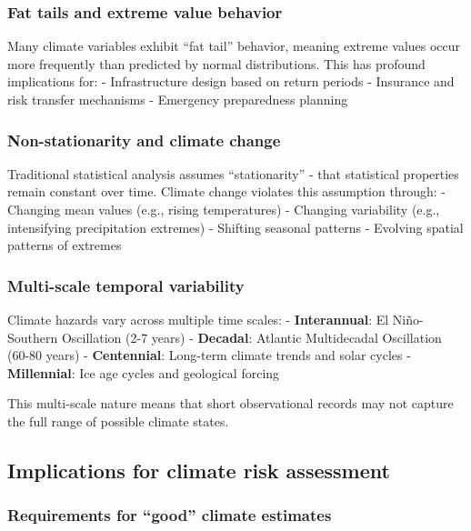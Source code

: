 \documentclass[
  letterpaper,
  DIV=11,
  numbers=noendperiod]{scrreprt}
\begin{document}
\subsubsection{Fat tails and extreme value
behavior}\label{fat-tails-and-extreme-value-behavior}

Many climate variables exhibit ``fat tail'' behavior, meaning extreme
values occur more frequently than predicted by normal distributions.
This has profound implications for: - Infrastructure design based on
return periods - Insurance and risk transfer mechanisms - Emergency
preparedness planning

\subsubsection{Non-stationarity and climate
change}\label{non-stationarity-and-climate-change}

Traditional statistical analysis assumes ``stationarity'' - that
statistical properties remain constant over time. Climate change
violates this assumption through: - Changing mean values (e.g., rising
temperatures) - Changing variability (e.g., intensifying precipitation
extremes) - Shifting seasonal patterns - Evolving spatial patterns of
extremes

\subsubsection{Multi-scale temporal
variability}\label{multi-scale-temporal-variability}

Climate hazards vary across multiple time scales: -
\textbf{Interannual}: El Niño-Southern Oscillation (2-7 years) -
\textbf{Decadal}: Atlantic Multidecadal Oscillation (60-80 years) -
\textbf{Centennial}: Long-term climate trends and solar cycles -
\textbf{Millennial}: Ice age cycles and geological forcing

This multi-scale nature means that short observational records may not
capture the full range of possible climate states.

\subsection{Implications for climate risk
assessment}\label{implications-for-climate-risk-assessment}

\subsubsection{Requirements for ``good'' climate
estimates}\label{requirements-for-good-climate-estimates}
\end{document}
